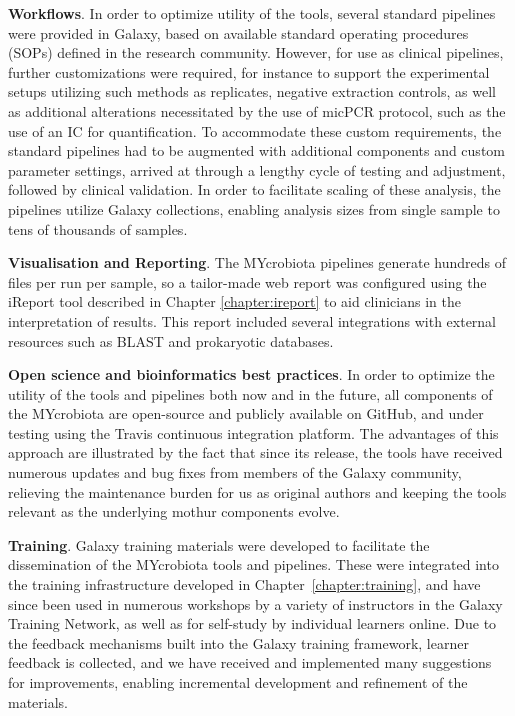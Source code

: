 \textbf{Workflows}. In order to optimize utility of the tools, several standard pipelines were provided in Galaxy, based on available standard operating procedures (SOPs) defined in the research community. However, for use as clinical pipelines, further customizations were required, for instance to support the experimental setups utilizing such methods as replicates, negative extraction controls, as well as additional alterations necessitated by the use of micPCR protocol, such as the use of an IC for quantification. To accommodate these custom requirements, the standard pipelines had to be augmented with additional components and custom parameter settings, arrived at through a lengthy cycle of testing and adjustment, followed by clinical validation. In order to facilitate scaling of these analysis, the pipelines utilize Galaxy collections, enabling analysis sizes from single sample to tens of thousands of samples.

\textbf{Visualisation and Reporting}. The MYcrobiota pipelines generate hundreds of files per run per sample, so a tailor-made web report was configured using the iReport tool described in Chapter \ref{chapter:ireport} to aid clinicians in the interpretation of results. This report included several integrations with external resources such as BLAST and prokaryotic databases.

\textbf{Open science and bioinformatics best practices}. In order to optimize the utility of the tools and pipelines both now and in the future, all components of the MYcrobiota are open-source and publicly available on GitHub, and under testing using the Travis continuous integration platform. The advantages of this approach are illustrated by the fact that since its release, the tools have received numerous updates and bug fixes from members of the Galaxy community, relieving the maintenance burden for us as original authors and keeping the tools relevant as the underlying mothur components evolve.

\textbf{Training}. Galaxy training materials were developed to facilitate the dissemination of the MYcrobiota tools and pipelines. These were integrated into the training infrastructure developed in Chapter~\ref{chapter:training}, and have since been used in numerous workshops by a variety of instructors in the Galaxy Training Network, as well as for self-study by individual learners online. Due to the feedback mechanisms built into the Galaxy training framework, learner feedback is collected, and we have received and implemented many suggestions for improvements, enabling incremental development and refinement of the materials.

